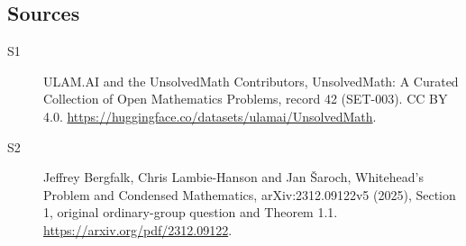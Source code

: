 \documentclass[11pt]{article}
\begin{document}
\subsection{Sources}
\begin{description}
\item[\hypertarget{source:42:1}{S1}] ULAM.AI and the UnsolvedMath Contributors, UnsolvedMath: A Curated Collection of Open Mathematics Problems, record 42 (SET-003). CC BY 4.0. \url{https://huggingface.co/datasets/ulamai/UnsolvedMath}.
\item[\hypertarget{source:42:2}{S2}] Jeffrey Bergfalk, Chris Lambie-Hanson and Jan Šaroch, Whitehead’s Problem and Condensed Mathematics, arXiv:2312.09122v5 (2025), Section 1, original ordinary-group question and Theorem 1.1. \url{https://arxiv.org/pdf/2312.09122}.
\end{description}
\label{end:42}
\end{document}

